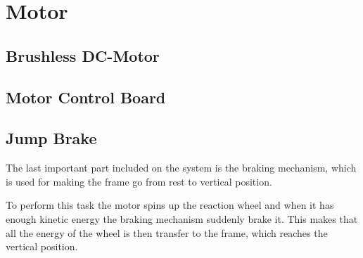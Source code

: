 \section{Motor}


\subsection{Brushless DC-Motor}


\subsection{Motor Control Board}


\subsection{Jump Brake}
The last important part included on the system is the braking mechanism, which is used for making the frame go from rest to vertical position. 

To perform this task the motor spins up the reaction wheel and when it has enough kinetic energy the braking mechanism suddenly brake it. This makes that all the energy of the wheel is then transfer to the frame, which reaches the vertical position.
